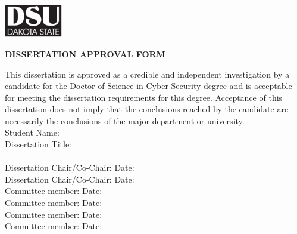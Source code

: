\begin{center}
    \includegraphics[width=1in]{img/DSU}
    
    \bigskip
    {\Large\bfseries DISSERTATION APPROVAL FORM}\\
    \end{center}
    
    \bigskip\smallskip
    
    This dissertation is approved as a credible and independent investigation by a candidate for the Doctor of Science in Cyber Security degree and is acceptable for meeting the dissertation requirements for this degree. Acceptance of this dissertation does not imply that the conclusions reached by the candidate are necessarily the conclusions of the major department or university.\\
    
    \noindent
    Student Name: \underline{\hspace*{3.5in}}\\
    
    \noindent
    Dissertation Title: \underline{\hspace*{.8\linewidth}}\\
    
    \noindent
    \underline{\hspace*{\linewidth}}\\
    
    \noindent
    Dissertation Chair/Co-Chair: \underline{\hspace*{2in}}\qquad Date: \underline{\hspace*{1.5in}} \\
    
    \noindent
    Dissertation Chair/Co-Chair: \underline{\hspace*{2in}}\qquad Date: \underline{\hspace*{1.5in}} \\   
    
    \noindent
    Committee member: \underline{\hspace*{2in}}\qquad Date: \underline{\hspace*{1.5in}} \\    
    
    \noindent
    Committee member: \underline{\hspace*{2in}}\qquad Date: \underline{\hspace*{1.5in}}\\    
    
    \noindent
    Committee member: \underline{\hspace*{2in}}\qquad Date: \underline{\hspace*{1.5in}}\\ 
    
    \noindent
    Committee member: \underline{\hspace*{2in}}\qquad Date: \underline{\hspace*{1.5in}}